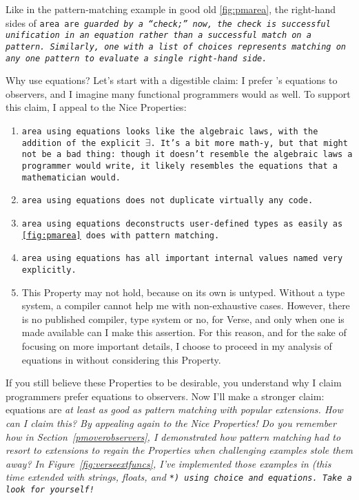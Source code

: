 \documentclass[manuscript,screen,review, 12pt, nonacm]{acmart}
\begin{document}
    Like in the pattern-matching example in good old \ref{fig:pmarea}, the
    right-hand sides of \tt{area} are \it{guarded} by a “check;” now, the check
    is successful unification in an equation rather than a successful match on a
    pattern. Similarly, \tt{one} with a list of choices represents matching on
    any \it{one} pattern to evaluate a single right-hand side. 

    Why use equations? Let's start with a digestible claim: I prefer \VC's
    equations to observers, and I imagine many functional programmers would as
    well. To support this claim, I appeal to the Nice Properties: 

    \begin{enumerate}
      \item \tt{area} using equations looks like the algebraic laws, with the
      addition of the explicit $\exists$. It's a bit more math-y, but that might
      not be a bad thing: though it doesn't resemble the algebraic laws a
      programmer would write, it likely resembles the equations that a
      mathematician would. 
      \item \tt{area} using equations does not duplicate virtually any code. 
      \item \tt{area} using equations deconstructs user-defined types as easily
      as \ref{fig:pmarea} does with pattern matching. 
      \item \tt{area} using equations has all important internal values named
      very explicitly.
      \item This Property may not hold, because \VC on its own is untyped.
      Without a type system, a compiler cannot help me with non-exhaustive
      cases. However, there is no published compiler, type system or no, for
      Verse, and only when one is made available can I make this assertion. For
      this reason, and for the sake of focusing on more important details, I
      choose to proceed in my analysis of equations in \VC without considering
      this Property. 
    \end{enumerate}

    If you still believe these Properties to be desirable, you understand why I
    claim programmers prefer equations to observers. Now I'll make a stronger
    claim: equations are \it{at least as good as} pattern matching with popular
    extensions. How can I claim this? By appealing again to the Nice Properties!
    Do you remember how in Section~\ref{pmoverobservers}, I demonstrated how
    pattern matching had to resort to extensions to regain the Properties when
    challenging examples stole them away? In Figure~\ref{fig:verseextfuncs},
    I've implemented those examples in \VC (this time extended with strings,
    floats, and \tt{*}) using choice and equations. Take a look for yourself! 
\end{document}
